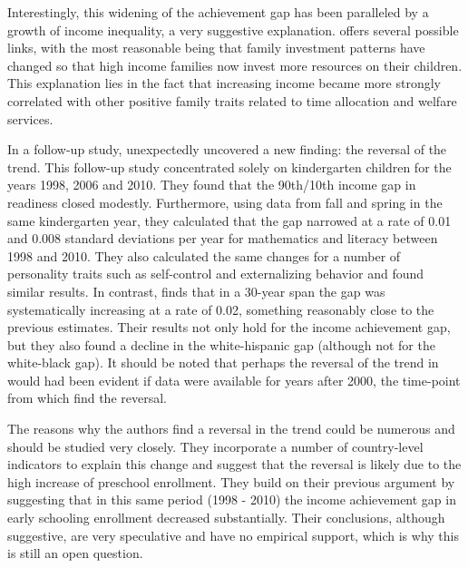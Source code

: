 \documentclass[11pt, a4paper]{article}\usepackage[]{graphicx}\usepackage[]{color}
\begin{document}
Interestingly, this widening of the achievement gap has been paralleled by a growth of income inequality, a very suggestive explanation. \citet{reardon2011} offers several possible links, with the most reasonable being that family investment patterns have changed so that high income families now invest more resources on their children. This explanation lies in the fact that increasing income became more strongly correlated with other positive family traits related to time allocation and welfare services.

In a follow-up study, \citet{reardon_portilla} unexpectedly uncovered a new finding: the reversal of the trend. This follow-up study concentrated solely on kindergarten children for the years 1998, 2006 and 2010. They found that the 90th/10th income gap in readiness closed modestly. Furthermore, using data from fall and spring in the same kindergarten year, they calculated that the gap narrowed at a rate of 0.01 and 0.008 standard deviations per year for mathematics and literacy between 1998 and 2010. They also calculated the same changes for a number of personality traits such as self-control and externalizing behavior and found similar results. In contrast, \citet{reardon2011} finds that in a 30-year span the gap was systematically increasing at a rate of 0.02, something reasonably close to the previous estimates. Their results not only hold for the income achievement gap, but they also found a decline in the white-hispanic gap (although not for the white-black gap). It should be noted that perhaps the reversal of the trend in \citet{reardon2011} would had been evident if data were available for years after 2000, the time-point from which \citet{reardon_portilla} find the reversal.

The reasons why the authors find a reversal in the trend could be numerous and should be studied very closely. They incorporate a number of country-level indicators to explain this change and suggest that the reversal is likely due to the high increase of preschool enrollment. They build on their previous argument by suggesting that in this same period (1998 - 2010) the income achievement gap in early schooling enrollment decreased substantially. Their conclusions, although suggestive, are very speculative and have no empirical support, which is why this is still an open question.
\end{document}
